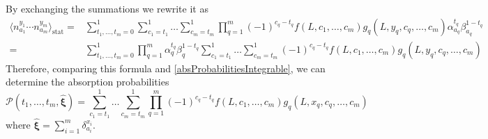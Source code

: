 \documentclass[10pt]{article}
\numberwithin{equation}{section}
\numberwithin{equation}{subsection}
\begin{document}
By exchanging the summations we rewrite it as 
\begin{equation}
\begin{split}
\langle n^{y_{1}}_{a_{1}}\cdots n^{y_{m}}_{a_{m}}\rangle_{\text{stat}}=&\sum_{t_{1},\ldots,t_{m}=0}^{1}
\sum_{c_{1}=t_{1}}^{1}\ldots\sum_{c_{m}=t_{m}}^{1}\prod_{q=1}^{m}(-1)^{c_{q}-t_{q}}f(L,c_{1},\ldots,c_{m})g_{q}(L,y_{q},c_{q},\ldots,c_{m})\alpha_{a_{q}}^{t_{q}}\beta_{a_{q}}^{1-t_{q}}\\
=&\sum_{t_{1},\ldots,t_{m}=0}^{1}\prod_{q=1}^{m}\alpha_{q}^{t_{q}}\beta_{q}^{1-t_{q}}\sum_{c_{1}=t_{1}}^{1}\ldots\sum_{c_{m}=t_{m}}^{1}(-1)^{c_{q}-t_{q}}f(L,c_{1},\ldots,c_{m})g_{q}(L,y_{q},c_{q},\ldots,c_{m})
\end{split}
\end{equation}
Therefore, comparing this formula and \eqref{absProbabilitiesIntegrable}, we can determine the absorption probabilities 
\begin{equation}
	\mathcal{P}(t_{1},\ldots,t_{m},\hat{\bm{\xi}})=\sum_{c_{1}=t_{1}}^{1}\ldots\sum_{c_{m}=t_{m}}^{1}\prod_{q=1}^{m}(-1)^{c_{q}-t_{q}}f(L,c_{1},\ldots,c_{m})g_{q}(L,x_{q},c_{q},\ldots,c_{m})
\end{equation}
where $\hat{\bm{\xi}}=\sum_{i=1}^{m}\delta_{a_{i}}^{x_{i}}$.  
\end{document}

